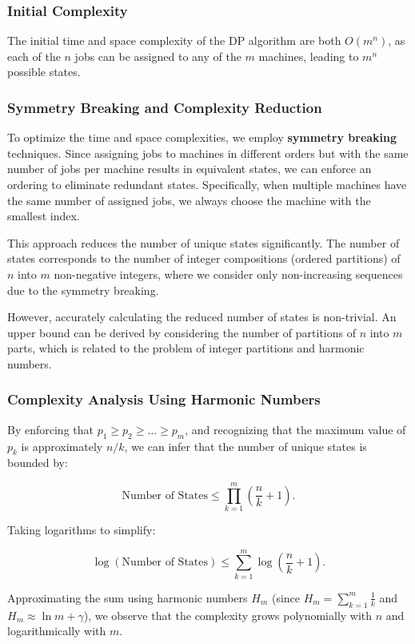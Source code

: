 \subsubsection{Initial Complexity}

The initial time and space complexity of the DP algorithm are both $O(m^n)$, as each of the $n$ jobs can be assigned to any of the $m$ machines, leading to $m^n$ possible states.

\subsubsection{Symmetry Breaking and Complexity Reduction}

To optimize the time and space complexities, we employ \textbf{symmetry breaking} techniques. Since assigning jobs to machines in different orders but with the same number of jobs per machine results in equivalent states, we can enforce an ordering to eliminate redundant states. Specifically, when multiple machines have the same number of assigned jobs, we always choose the machine with the smallest index.

This approach reduces the number of unique states significantly. The number of states corresponds to the number of integer compositions (ordered partitions) of $n$ into $m$ non-negative integers, where we consider only non-increasing sequences due to the symmetry breaking.

However, accurately calculating the reduced number of states is non-trivial. An upper bound can be derived by considering the number of partitions of $n$ into $m$ parts, which is related to the problem of integer partitions and harmonic numbers.

\subsubsection{Complexity Analysis Using Harmonic Numbers}

By enforcing that $p_1 \geq p_2 \geq \dots \geq p_m$, and recognizing that the maximum value of $p_k$ is approximately $n/k$, we can infer that the number of unique states is bounded by:

\[
    \text{Number of States} \leq \prod_{k=1}^{m} \left( \frac{n}{k} + 1 \right).
\]

Taking logarithms to simplify:

\[
    \log(\text{Number of States}) \leq \sum_{k=1}^{m} \log\left( \frac{n}{k} + 1 \right).
\]

Approximating the sum using harmonic numbers $H_m$ (since $H_m = \sum_{k=1}^{m} \frac{1}{k}$ and $H_m \approx \ln m + \gamma$), we observe that the complexity grows polynomially with $n$ and logarithmically with $m$.


